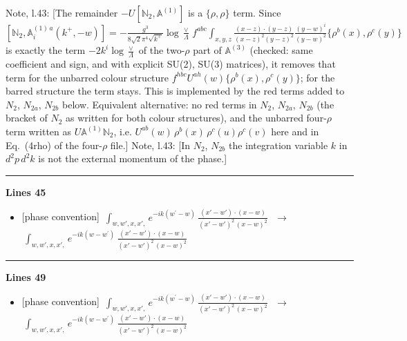 \documentclass[10pt]{article}
\newenvironment{notebox}{\def\FrameCommand{{\color{notebar}\vrule width 1.5pt}\hspace{6pt}}\MakeFramed{\advance\hsize-\width\FrameRestore}\small}{\endMakeFramed}
\def\mf#1{\mathbb{#1}}
\begin{document}
\begin{notebox}\textsf{\small Note, l.43:} [The remainder $-U[\mf{N}_{2},\mf{A}^{(1)}]$ is a $\{\rho,\rho\}$ term. Since $[\mf{N}_{2},\mf{A}^{(1)\,a}_{i}(k^{+},-w)]=-\frac{g^{3}}{8\sqrt{2}\pi^{4}\sqrt{k^{+}}}\log\frac{\vee}{\Lambda}\,f^{abc}\int_{x,y,z}\frac{(x-z)\cdot(y-z)}{(x-z)^{2}(y-z)^{2}}\frac{(y-w)^{i}}{(y-w)^{2}}\{\rho^{b}(x),\rho^{c}(y)\}$ is exactly the term $-2k^{i}\log\frac{\vee}{\Lambda}$ of the two-$\rho$ part of $\mf{A}^{(3)}$ (checked: same coefficient and sign, and with explicit SU(2), SU(3) matrices), it removes that term for the unbarred colour structure $f^{hbc}U^{ah}(w)\{\rho^{b}(x),\rho^{c}(y)\}$; for the barred structure the term stays. This is implemented by the red terms added to $N_{2}$, $N_{2a}$, $N_{2b}$ below. Equivalent alternative: no red terms in $N_{2}$, $N_{2a}$, $N_{2b}$ (the bracket of $N_{2}$ as written for both colour structures), and the unbarred four-$\rho$ term written as $U\mf{A}^{(1)}\mf{N}_{2}$, i.e. $U^{ab}(w)\,\rho^{b}(x)\,\rho^{c}(u)\rho^{c}(v)$ here and in Eq.~(4rho) of the four-$\rho$ file.]\end{notebox}
\begin{notebox}\textsf{\small Note, l.43:} [In $N_{2}$, $N_{2b}$ the integration variable $k$ in $d^{2}p\,d^{2}k$ is not the external momentum of the phase.]\end{notebox}
\noindent\rule{\linewidth}{0.3pt}\par\noindent\textbf{Lines 45} \par
\begin{itemize}[leftmargin=2.2em,itemsep=1pt,topsep=2pt]
\item[\textbf{l.45}] \textsf{\small [phase convention]} $\displaystyle \, \int_{w, w',x,x',} e^{-ik(w^\prime-w)}\, \frac{(x'-w')\cdot (x-w)}{(x'-w')^{2}\, (x-w)^{2}}\,$\ $\longrightarrow$\ $\displaystyle \, \int_{w, w',x,x',} e^{-ik(w-w^\prime)}\, \frac{(x'-w')\cdot (x-w)}{(x'-w')^{2}\, (x-w)^{2}}\,$
\end{itemize}
\noindent\rule{\linewidth}{0.3pt}\par\noindent\textbf{Lines 49} \par
\begin{itemize}[leftmargin=2.2em,itemsep=1pt,topsep=2pt]
\item[\textbf{l.49}] \textsf{\small [phase convention]} $\displaystyle \, \int_{w, w',x,x',} e^{-ik(w^\prime-w)}\, \frac{(x'-w')\cdot (x-w)}{(x'-w')^{2}\, (x-w)^{2}}\,$\ $\longrightarrow$\ $\displaystyle \, \int_{w, w',x,x',} e^{-ik(w-w^\prime)}\, \frac{(x'-w')\cdot (x-w)}{(x'-w')^{2}\, (x-w)^{2}}\,$
\end{itemize}
\end{document}
